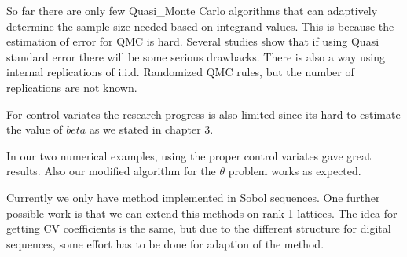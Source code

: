 
So far there are only few Quasi\_Monte Carlo algorithms that can adaptively determine the sample size needed based on integrand values. This is because the estimation of error for QMC is hard. Several studies show that if using Quasi standard error there will be some serious drawbacks\cite{owen2006warnock}. There is also a way using internal replications of i.i.d. Randomized QMC rules, but the number of replications are not known\cite{hickernell2005control}.

For control variates the research progress is also limited since its hard to estimate the value of $beta$ as we stated in chapter 3. 

In our two numerical examples, using the proper control variates gave great results.  Also our modified algorithm for the $\theta$ problem works as expected.   


Currently we only have method implemented in Sobol sequences. One further possible work is that we can extend this methods on rank-1 lattices\cite{rugama2014adaptive}. The idea for getting CV coefficients is the same, but due to the different structure for digital sequences, some effort has to be done for adaption of the method. 

